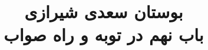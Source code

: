 \documentclass[14pt,b5paper]{article}
\begin{document}
\title{\Huge بوستان سعدی شیرازی \\
باب نهم در توبه و راه صواب}
\author{ }
\date{ }
\maketitle
\newpage
\tableofcontents
\newpage

\newpage

\newpage

\newpage

\newpage

\newpage

\newpage

\newpage

\newpage

\newpage

\newpage

\newpage

\newpage

\newpage

\newpage

\newpage

\newpage

\newpage

\newpage

\newpage

\newpage

\newpage

\newpage
\end{document}
